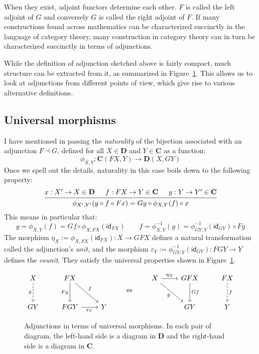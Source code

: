 \documentclass[11pt,oneside]{book}
\theoremstyle{definition}
\newcommand{\kw}[1]{\ensuremath{ \mathsf{#1} }}
\begin{document}
When they exist,
adjoint functors determine each other.
$F$ is called the left adjoint of $G$ and
conversely
$G$ is called the right adjoint of $F$.
If many constructions found across mathematics
can be characterized succinctly in the language of category theory,
many construction in category theory
can in turn be characterized succinctly in terms of adjunctions.

While the definition of adjunction sketched above
is fairly compact,
much structure can be extracted from it,
as summarized in Figure~\ref{fig:adjunction}.
This allows us to look at adjunctions
from different points of view,
which give rise to various alternative definitions.


\subsection{Universal morphisms} %

I have mentioned in passing the \emph{naturality}
of the bijection associated with an adjunction $F \dashv G$,
defined for all $X \in \mathbf{D}$ and $Y \in \mathbf{C}$ as
a function:
\[
  \phi_{X, Y} : \mathbf{C}(F X, Y) \rightarrow \mathbf{D}(X, G Y)
\]
Once we spell out the details,
naturality in this case boils down to the following property:
\[
  \begin{prooftree}
    \hypo{x : X' \rightarrow X \in \mathbf{D}}
    \hypo{f : F X \rightarrow Y \in \mathbf{C}}
    \hypo{y : Y \rightarrow Y' \in \mathbf{C}}
    \infer3{\phi_{X',Y'}(y \circ f \circ F x) =
            G y \circ \phi_{X,Y}(f) \circ x}
  \end{prooftree}
\]
This means in particular that:
\[
  g = \phi_{X,Y}(f)
    = G f \circ \phi_{X,FX}(\kw{id}_{F X})
  \qquad
  f = \phi_{X,Y}^{-1}(g)
    = \phi_{GY,Y}^{-1}(\kw{id}_{G Y}) \circ F g
\]
The morphism
$\eta_X := \phi_{X,FX}(\kw{id}_{F X}) : X \rightarrow GFX$
defines a natural transformation
called the adjunction's \emph{unit},
and the morphism
$\varepsilon_Y := \phi_{GY,Y}^{-1}(\kw{id}_{G Y}) : FGY \rightarrow Y$
defines the \emph{counit}.
They satisfy the universal properties shown in
Figure~\ref{fig:adjunction}.

\begin{figure} %
  \[
    \begin{tikzcd}[row sep=large]
      X \ar[d, "g"', dashed] &
      FX \ar[d, "F g"'] \ar[dr, "f"] &
      \\
      G Y &
      F G Y \ar[r, "\varepsilon_Y"'] &
      Y
    \end{tikzcd}
    \qquad \Leftrightarrow \qquad
    \begin{tikzcd}[row sep=large]
      X \ar[r, "\eta_X"] \ar[dr, "g"'] &
      G F X \ar[d, "G f"] &
      F X \ar[d, "f", dashed]
      \\ &
      G Y & Y
    \end{tikzcd}
  \]
  \caption[Adjunctions in terms of universal morphisms]%
   {Adjunctions in terms of universal morphisms.
    In each pair of diagram,
    the left-hand side is a diagram in $\mathbf{D}$ and
    the right-hand side is a diagram in $\mathbf{C}$.}
  \label{fig:adjunction}
\end{figure}
\end{document}

